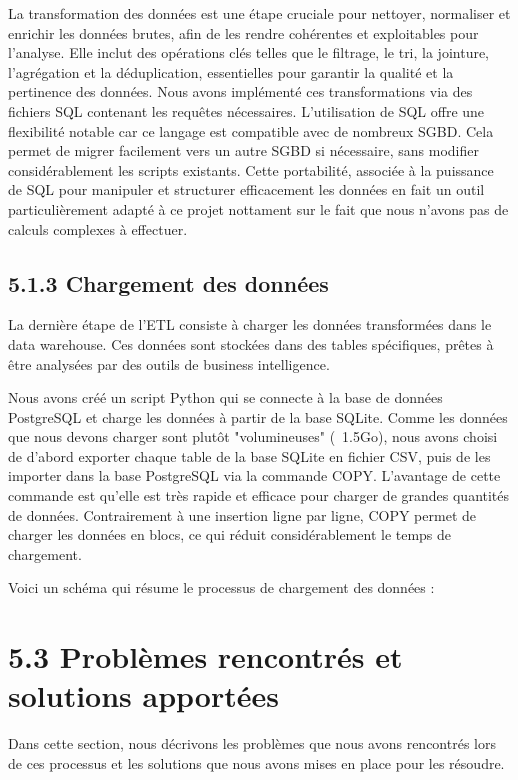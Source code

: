\begin{itemize}
\begin{itemize}
La transformation des données est une étape cruciale pour nettoyer, normaliser et enrichir les données brutes, afin de les rendre cohérentes et exploitables pour l’analyse.
Elle inclut des opérations clés telles que le filtrage, le tri, la jointure, l’agrégation et la déduplication, essentielles pour garantir la qualité et la pertinence des données.
Nous avons implémenté ces transformations via des fichiers SQL contenant les requêtes nécessaires.
L’utilisation de SQL offre une flexibilité notable car ce langage est compatible avec de nombreux SGBD.
Cela permet de migrer facilement vers un autre SGBD si nécessaire, sans modifier considérablement les scripts existants.
Cette portabilité, associée à la puissance de SQL pour manipuler et structurer efficacement les données en fait un outil particulièrement adapté à ce projet nottament sur le fait que nous n'avons pas de calculs complexes à effectuer.


\subsection{5.1.3 Chargement des données}

La dernière étape de l’ETL consiste à charger les données transformées dans le data warehouse. Ces données sont stockées dans des tables spécifiques, prêtes à être
analysées par des outils de business intelligence.

Nous avons créé un script Python qui se connecte à la base de données PostgreSQL et charge les données à partir de la base SQLite.
Comme les données que nous devons charger sont plutôt "volumineuses" (~1.5Go), nous avons choisi de d'abord exporter chaque table de la base SQLite en fichier CSV, puis de les
importer dans la base PostgreSQL via la commande COPY. L'avantage de cette commande est qu'elle est très rapide et efficace pour charger de grandes quantités de données.
Contrairement à une insertion ligne par ligne, COPY permet de charger les données en blocs, ce qui réduit considérablement le temps de chargement.

Voici un schéma qui résume le processus de chargement des données :


\section{5.3 Problèmes rencontrés et solutions apportées}

Dans cette section, nous décrivons les problèmes que nous avons rencontrés lors de ces processus et les solutions que nous avons mises en place pour les résoudre.


\end{itemize}
\end{itemize}
